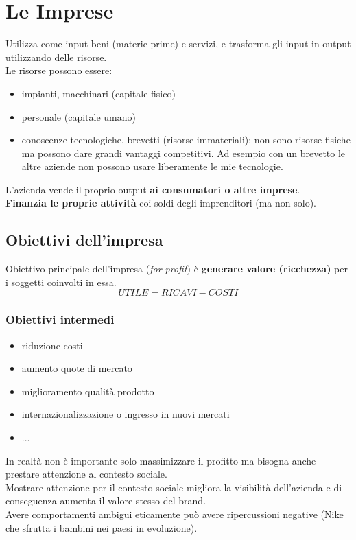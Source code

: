 \documentclass[../main.tex]{subfiles}
\begin{document}
\section{Le Imprese}

Utilizza come input beni (materie prime) e servizi, e trasforma gli input in output utilizzando delle risorse.\\
Le risorse possono essere:

\begin{itemize}
    \item impianti, macchinari (capitale fisico)
    \item personale (capitale umano)
    \item conoscenze tecnologiche, brevetti (risorse immateriali): non sono risorse fisiche ma possono dare grandi vantaggi competitivi. Ad esempio con un brevetto le altre aziende non possono usare liberamente le mie tecnologie.
\end{itemize}

L'azienda vende il proprio output \textbf{ai consumatori o altre imprese}.\\
\textbf{Finanzia le proprie attività} coi soldi degli imprenditori (ma non solo).


\subsection{Obiettivi dell'impresa}

Obiettivo principale dell'impresa (\emph{for profit}) è \textbf{generare valore (ricchezza)} per i soggetti coinvolti in essa.
$$ UTILE = RICAVI - COSTI $$

\subsubsection{Obiettivi intermedi}

\begin{itemize}
    \item riduzione costi
    \item aumento quote di mercato
    \item miglioramento qualità prodotto
    \item internazionalizzazione o ingresso in nuovi mercati
    \item ...
\end{itemize}

In realtà non è importante solo massimizzare il profitto ma bisogna anche prestare attenzione al contesto sociale.\\
Mostrare attenzione per il contesto sociale migliora la visibilità dell'azienda e di conseguenza aumenta il valore stesso del brand.\\
Avere comportamenti ambigui eticamente può avere ripercussioni negative (Nike che sfrutta i bambini nei paesi in evoluzione).
\end{document}
